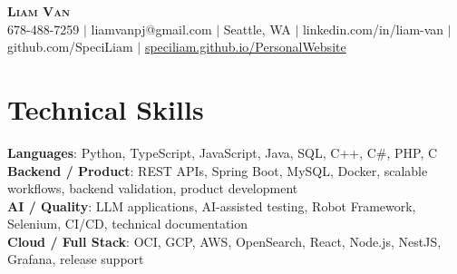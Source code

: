 \documentclass[letterpaper,11pt]{article}
\begin{document}

%
\begin{center}
    \textbf{\Huge \scshape Liam Van} \\ \vspace{1pt}
    \small 678-488-7259 $|$ \small {liamvanpj@gmail.com} $|$ Seattle, WA
 {{$|$ linkedin.com/in/liam-van} {$|$ github.com/SpeciLiam} {$|$ \href{https://speciliam.github.io/PersonalWebsite}{speciliam.github.io/PersonalWebsite}}}

\end{center}

\section{Technical Skills}
 \begin{itemize}[leftmargin=0.15in, label={}]
    \small{\item{
     \textbf{Languages}{: Python, TypeScript, JavaScript, Java, SQL, C++, C\#, PHP, C} \\
     \textbf{Backend / Product}{: REST APIs, Spring Boot, MySQL, Docker, scalable workflows, backend validation, product development} \\
     \textbf{AI / Quality}{: LLM applications, AI-assisted testing, Robot Framework, Selenium, CI/CD, technical documentation} \\
     \textbf{Cloud / Full Stack}{: OCI, GCP, AWS, OpenSearch, React, Node.js, NestJS, Grafana, release support} \\
    }}
 \end{itemize}
%
\end{document}
